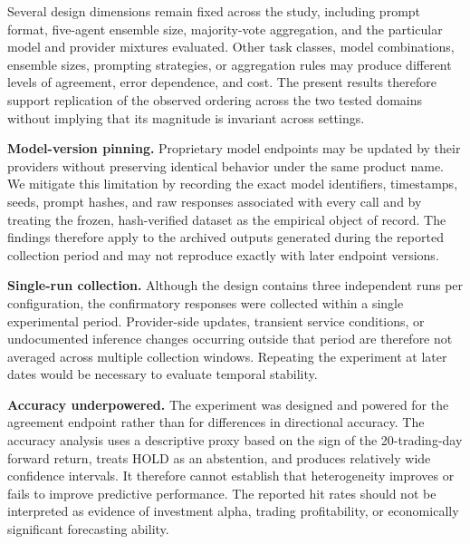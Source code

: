 \documentclass{ieeeaccess}
\begin{document}
Several design dimensions remain fixed across the study, including prompt format,
five-agent ensemble size, majority-vote aggregation, and the particular model and
provider mixtures evaluated. Other task classes, model combinations, ensemble
sizes, prompting strategies, or aggregation rules may produce different levels of
agreement, error dependence, and cost. The present results therefore support
replication of the observed ordering across the two tested domains without
implying that its magnitude is invariant across settings.

\textbf{Model-version pinning.}
Proprietary model endpoints may be updated by their providers without preserving
identical behavior under the same product name. We mitigate this limitation by
recording the exact model identifiers, timestamps, seeds, prompt hashes, and raw
responses associated with every call and by treating the frozen, hash-verified
dataset as the empirical object of record. The findings therefore apply to the
archived outputs generated during the reported collection period and may not
reproduce exactly with later endpoint versions.

\textbf{Single-run collection.}
Although the design contains three independent runs per configuration, the
confirmatory responses were collected within a single experimental period.
Provider-side updates, transient service conditions, or undocumented inference
changes occurring outside that period are therefore not averaged across multiple
collection windows. Repeating the experiment at later dates would be necessary
to evaluate temporal stability.

\textbf{Accuracy underpowered.}
The experiment was designed and powered for the agreement endpoint rather than
for differences in directional accuracy. The accuracy analysis uses a
descriptive proxy based on the sign of the 20-trading-day forward return, treats
HOLD as an abstention, and produces relatively wide confidence intervals. It
therefore cannot establish that heterogeneity improves or fails to improve
predictive performance. The reported hit rates should not be interpreted as
evidence of investment alpha, trading profitability, or economically significant
forecasting ability.
\end{document}
